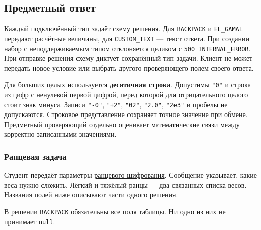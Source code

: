 \documentclass[12pt,a4paper]{article}
\begin{document}
\subsection{Предметный ответ}\label{ux43fux440ux435ux434ux43cux435ux442ux43dux44bux439-ux43eux442ux432ux435ux442}

\hypertarget{предметный-ответ}{}

Каждый подключённый тип задаёт схему решения. Для \texttt{BACKPACK} и \texttt{EL\_GAMAL} передают расчётные величины, для \texttt{CUSTOM\_\allowbreak{}TEXT} --- текст ответа. При создании набор с неподдерживаемым типом отклоняется целиком с \texttt{500 INTERNAL\_\allowbreak{}ERROR}. При отправке решения схему диктует сохранённый тип задачи. Клиент не может передать новое условие или выбрать другого проверяющего полем своего ответа.

Для больших целых используется \textbf{десятичная строка}. Допустимы \texttt{"0"} и строка из цифр с ненулевой первой цифрой, перед которой для отрицательного целого стоит знак минуса. Записи \texttt{"-0"}, \texttt{"+2"}, \texttt{"02"}, \texttt{"2.0"}, \texttt{"2e3"} и пробелы не допускаются. Строковое представление сохраняет точное значение при обмене. Предметный проверяющий отдельно оценивает математические связи между корректно записанными значениями.

\subsubsection{Ранцевая задача}\label{ux440ux430ux43dux446ux435ux432ux430ux44f-ux437ux430ux434ux430ux447ux430}

\hypertarget{ранцевая-задача}{}

Студент передаёт параметры {\href{DOC-06.3\_Ранцевые\_криптосистемы.pdf\#как-устроена-ранцевая-задача}{ранцевого шифрования}}. Сообщение указывает, какие веса нужно сложить. Лёгкий и тяжёлый ранцы --- два связанных списка весов. Названия полей ниже описывают части одного решения.

В решении \texttt{BACKPACK} обязательны все поля таблицы. Ни одно из них не принимает \texttt{null}.
\end{document}
